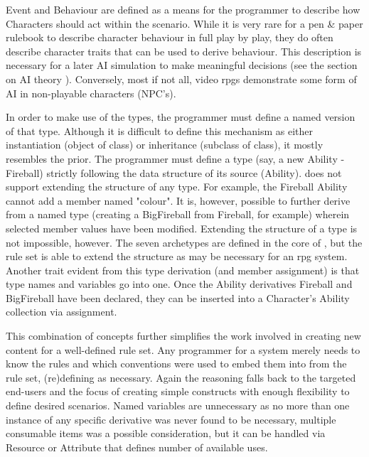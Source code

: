 Event and Behaviour are defined as a means for the programmer to describe how Characters should act within the scenario. While it is very rare for a pen \& paper rulebook to describe character behaviour in full play by play, they do often describe character traits that can be used to derive behaviour. This description is necessary for a later AI simulation to make meaningful decisions (see the section on AI theory ). Conversely, most if not all, video \ac{rpgs} demonstrate some form of AI in non-playable characters (NPC's).

In order to make use of the types, the programmer must define a named version of that type. Although it is difficult to define this mechanism as either instantiation (object of class) or inheritance (subclass of class), it mostly resembles the prior. The programmer must define a type (say, a new Ability - Fireball) strictly following the data structure of its source (Ability). \langname{} does not support extending the structure of any type. For example, the Fireball Ability cannot add a member named "colour". It is, however, possible to further derive from a named type (creating a BigFireball from Fireball, for example) wherein selected member values have been modified. Extending the structure of a type is not impossible, however. The seven archetypes are defined in the core of \langname{}, but the rule set is able to extend the structure as may be necessary for an \ac{rpg} system. Another trait evident from this type derivation (and member assignment) is that type names and variables go into one. Once the Ability derivatives Fireball and BigFireball have been declared, they can be inserted into a Character's Ability collection via assignment.

This combination of concepts further simplifies the work involved in creating new content for a well-defined rule set. Any \langname{} programmer for a system merely needs to know the rules and which conventions were used to embed them into \langname{} from the rule set, (re)defining as necessary.
Again the reasoning falls back to the targeted end-users and the focus of creating simple constructs with enough flexibility to define desired scenarios. Named variables are unnecessary as no more than one instance of any specific derivative was never found to be necessary, multiple consumable items was a possible consideration, but it can be handled via Resource or Attribute that defines number of available uses.
